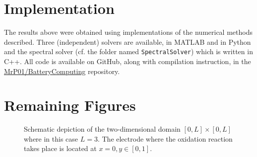 \documentclass{prettytex/ox/mmsc-special-topic}
\begin{document}
  \appendix
  \section{Implementation}
  The results above were obtained using implementations of the numerical methods described.
  Three (independent) solvers are available, in MATLAB and in Python and the spectral solver (cf. the folder named \texttt{SpectralSolver}) which is written in C++.
  All code is available on GitHub, along with compilation instruction, in the \href{https://github.com/MrP01/BatteryComputing}{MrP01/BatteryComputing} repository.

  \section{Remaining Figures}
  \begin{figure}[H]
    \centering
    \caption{Schematic depiction of the two-dimensional domain $[0, L] \times [0, L]$ where in this case $L = 3$. The electrode where the oxidation reaction takes place is located at $x=0, y \in [0, 1]$.}
    \label{fig:2d-case}
  \end{figure}
\end{document}

